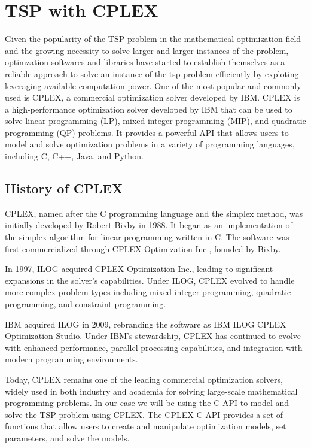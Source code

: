 \documentclass{article}
\begin{document}
\section{TSP with CPLEX}
Given the popularity of the TSP problem in the mathematical optimization field and the growing necessity to solve larger and larger instances of the problem,
optimzation softwares and libraries have started to establish themselves as a reliable approach to  solve an instance of the tsp problem efficiently by exploting 
leveraging available computation power. One of the most popular and commonly used is CPLEX, a commercial optimization solver developed by IBM.\@
CPLEX is a high-performance optimization solver developed by IBM that can be used to solve linear programming (LP), mixed-integer programming (MIP), and quadratic programming (QP) problems.
It provides a powerful API that allows users to model and solve optimization problems in a variety of programming languages, including C, C++, Java, and Python.

\subsection{History of CPLEX}
CPLEX, named after the C programming language and the simplex method, was initially developed by Robert Bixby in 1988. 
It began as an implementation of the simplex algorithm for linear programming written in C. The software was first commercialized through CPLEX Optimization Inc., founded by Bixby.

In 1997, ILOG acquired CPLEX Optimization Inc., leading to significant expansions in the solver's capabilities. 
Under ILOG, CPLEX evolved to handle more complex problem types including mixed-integer programming, quadratic programming, 
and constraint programming.

IBM acquired ILOG in 2009, rebranding the software as IBM ILOG CPLEX Optimization Studio. Under IBM's stewardship, CPLEX has 
continued to evolve with enhanced performance, parallel processing capabilities, and integration with modern programming environments.

Today, CPLEX remains one of the leading commercial optimization solvers, widely used in both industry and academia for solving 
large-scale mathematical programming problems.
In our case we will be using the C API to model and solve the TSP problem using CPLEX. The CPLEX C API provides a set of functions 
that allow users to create and manipulate optimization models, 
set parameters, and solve the models.
\end{document}
